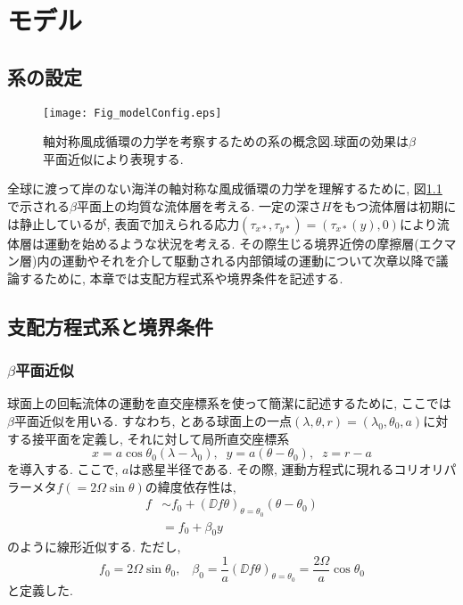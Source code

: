 \chapter{モデル}

\section{系の設定}
\begin{figure}[b]
 \centering
 \texttt{[image: Fig\_modelConfig.eps]}
\caption{軸対称風成循環の力学を考察するための系の概念図.球面の効果は$\beta$平面近似により表現する.}
\label{fig:modelConfig}
\end{figure}
全球に渡って岸のない海洋の軸対称な風成循環の力学を理解するために, 
図\ref{fig:modelConfig} で示される$\beta$平面上の均質な流体層を考える. 
一定の深さ$H$をもつ流体層は初期には静止しているが, 
表面で加えられる応力$(\tau_{x*},\tau_{y*})=(\tau_{x*}(y),0)$により流体層は運動を始めるような状況を考える.  
その際生じる境界近傍の摩擦層(エクマン層)内の運動やそれを介して駆動される内部領域の運動について次章以降で議論するために, 本章では支配方程式系や境界条件を記述する. 


\section{支配方程式系と境界条件}
\subsection{$\beta$平面近似}
球面上の回転流体の運動を直交座標系を使って簡潔に記述するために, 
ここでは$\beta$平面近似を用いる. 
すなわち, とある球面上の一点$(\lambda,\theta,r)=(\lambda_0,\theta_0,a)$に対する接平面を定義し, それに対して局所直交座標系
\begin{equation}
  x = a\cos{\theta_0} (\lambda - \lambda_0), \;\; 
  y = a(\theta - \theta_0), \;\;
  z = r - a
\end{equation}
を導入する. 
ここで, $a$は惑星半径である. 
その際, 運動方程式に現れるコリオリパラーメタ$f(=2\Omega \sin\theta)$の緯度依存性は, 
\begin{equation}
\begin{split}
 f &\sim f_0 + \left(\DD{f}{\theta}\right)_{\theta=\theta_0} (\theta - \theta_0) \\
   &= f_0 + \beta_0 y
\end{split}
\end{equation}
のように線形近似する. 
ただし, 
\begin{equation}
  f_0 = 2\Omega \sin{\theta_0}, \;\;\; \beta_0 = \dfrac{1}{a} \left(\DD{f}{\theta}\right)_{\theta=\theta_0} = \dfrac{2\Omega}{a} \cos{\theta_0}
\end{equation}
と定義した. 

